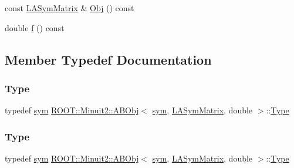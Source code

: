 \begin{DoxyCompactItemize}
\item 
const \mbox{\hyperlink{classROOT_1_1Minuit2_1_1LASymMatrix}{L\+A\+Sym\+Matrix}} \& \mbox{\hyperlink{classROOT_1_1Minuit2_1_1ABObj_3_01sym_00_01LASymMatrix_00_01double_01_4_a8caec6ce565f8d3729c663088d40233e}{Obj}} () const
\item 
double \mbox{\hyperlink{classROOT_1_1Minuit2_1_1ABObj_3_01sym_00_01LASymMatrix_00_01double_01_4_ad664e57b0a6720ab9c267c662c76b78f}{f}} () const
\end{DoxyCompactItemize}


\subsection{Member Typedef Documentation}
\mbox{\label{classROOT_1_1Minuit2_1_1ABObj_3_01sym_00_01LASymMatrix_00_01double_01_4_ac7186d69c32b1e8a607ae45125e869c0}} 
\subsubsection{\texorpdfstring{Type}{Type}\hspace{0.1cm}{\footnotesize\ttfamily [1/3]}}
{\footnotesize\ttfamily typedef \mbox{\hyperlink{classROOT_1_1Minuit2_1_1sym}{sym}} \mbox{\hyperlink{classROOT_1_1Minuit2_1_1ABObj}{R\+O\+O\+T\+::\+Minuit2\+::\+A\+B\+Obj}}$<$ \mbox{\hyperlink{classROOT_1_1Minuit2_1_1sym}{sym}}, \mbox{\hyperlink{classROOT_1_1Minuit2_1_1LASymMatrix}{L\+A\+Sym\+Matrix}}, double $>$\+::\mbox{\hyperlink{classROOT_1_1Minuit2_1_1ABObj_3_01sym_00_01LASymMatrix_00_01double_01_4_ac7186d69c32b1e8a607ae45125e869c0}{Type}}}

\mbox{\label{classROOT_1_1Minuit2_1_1ABObj_3_01sym_00_01LASymMatrix_00_01double_01_4_ac7186d69c32b1e8a607ae45125e869c0}} 
\subsubsection{\texorpdfstring{Type}{Type}\hspace{0.1cm}{\footnotesize\ttfamily [2/3]}}
{\footnotesize\ttfamily typedef \mbox{\hyperlink{classROOT_1_1Minuit2_1_1sym}{sym}} \mbox{\hyperlink{classROOT_1_1Minuit2_1_1ABObj}{R\+O\+O\+T\+::\+Minuit2\+::\+A\+B\+Obj}}$<$ \mbox{\hyperlink{classROOT_1_1Minuit2_1_1sym}{sym}}, \mbox{\hyperlink{classROOT_1_1Minuit2_1_1LASymMatrix}{L\+A\+Sym\+Matrix}}, double $>$\+::\mbox{\hyperlink{classROOT_1_1Minuit2_1_1ABObj_3_01sym_00_01LASymMatrix_00_01double_01_4_ac7186d69c32b1e8a607ae45125e869c0}{Type}}}

